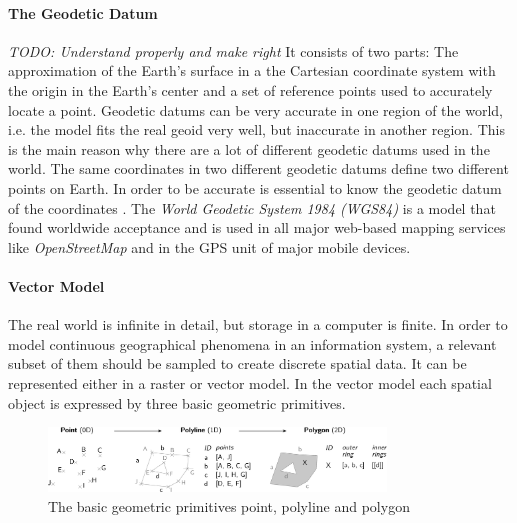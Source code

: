 \paragraph{The Geodetic Datum} %
\label{par:geodetic_datum}

\emph{TODO: Understand properly and make right}
It consists of two parts: The approximation of the Earth's surface in a the Cartesian coordinate system with the origin in the Earth's center and a set of reference points used to accurately locate a point. Geodetic datums can be very accurate in one region of the world, i.e. the model fits the real geoid very well, but inaccurate in another region. This is the main reason why there are a lot of different geodetic datums used in the world. The same coordinates in two different geodetic datums define two different points on Earth. In order to be accurate is essential to know the geodetic datum of the coordinates
\cite[p. 80]{bolstad2008gis}.
The \emph{World Geodetic System 1984 (WGS84)} is a model that found worldwide acceptance and is used in all major web-based mapping services like \emph{OpenStreetMap} and in the GPS unit of major mobile devices.


\paragraph{Vector Model} %
\label{ssub:vector_model}

The real world is infinite in detail, but storage in a computer is finite. In order to model continuous geographical phenomena in an information system, a relevant subset of them should be sampled to create discrete spatial data. It can be represented either in a raster or vector model. In the vector model each spatial object is expressed by three basic geometric primitives.

\begin{figure}[H]
  \vspace{1em}
  \centering
  \includegraphics[width=0.8\textwidth]{graphics/basics/hgis/geometric_primitives}
  \caption{The basic geometric primitives point, polyline and polygon}
  \label{fig:geometric_primitives}
\end{figure}


